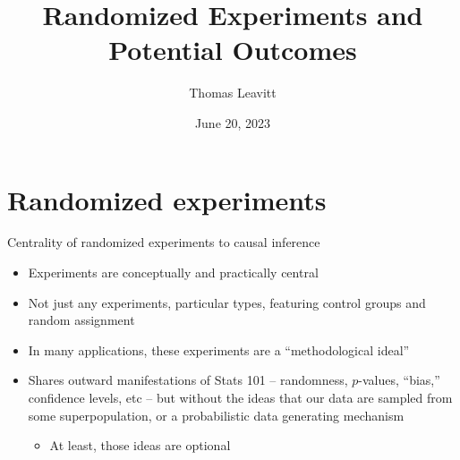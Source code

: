 \documentclass[table, xcolor = {dvipsnames}, 9pt]{beamer}
\title[]{Randomized Experiments and Potential Outcomes} %
\author{Thomas Leavitt} %
\institute[] %
{
\medskip
\textit{} %
}
\date{June 20, 2023} %
\theoremstyle{plain}
\begin{document}
\begin{frame}
\titlepage %
\end{frame}


\section{Randomized experiments}
\begin{frame}{Centrality of randomized experiments to causal inference}
\vfill
\begin{itemize}
\item Experiments are conceptually and practically central \vfill
\item Not just any experiments, particular types, featuring control groups and random assignment \vfill
\item In many applications, these experiments are a ``methodological ideal'' \vfill
\item Shares outward manifestations of Stats 101 -- randomness, $p$-values, ``bias,'' confidence levels, etc -- but without the ideas that our data are sampled from some superpopulation, or a probabilistic data generating mechanism \vfill
\begin{itemize} \vfill
\item At least, those ideas are optional \vfill
\end{itemize} \vfill
\end{itemize} \vfill
\end{frame}
\end{document}
